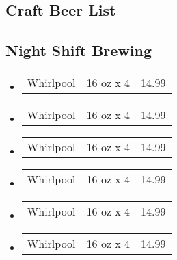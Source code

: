 \documentclass[10pt, letterpaper]{article}
\begin{document}
  \begin{multicols}{3}
  
  \section*{Craft Beer List}
  \subsection*{Night Shift Brewing}
    \begin{itemize}
      \item[]\begin{tabular}{l c r}Whirlpool & 16 oz x 4 & 14.99\end{tabular}
      \item[]\begin{tabular}{l c r}Whirlpool & 16 oz x 4 & 14.99\end{tabular}
      \item[]\begin{tabular}{l c r}Whirlpool & 16 oz x 4 & 14.99\end{tabular}
      \item[]\begin{tabular}{l c r}Whirlpool & 16 oz x 4 & 14.99\end{tabular}
      \item[]\begin{tabular}{l c r}Whirlpool & 16 oz x 4 & 14.99\end{tabular}
      \item[]\begin{tabular}{l c r}Whirlpool & 16 oz x 4 & 14.99\end{tabular}
    \end{itemize}

\end{multicols}
\end{document}
